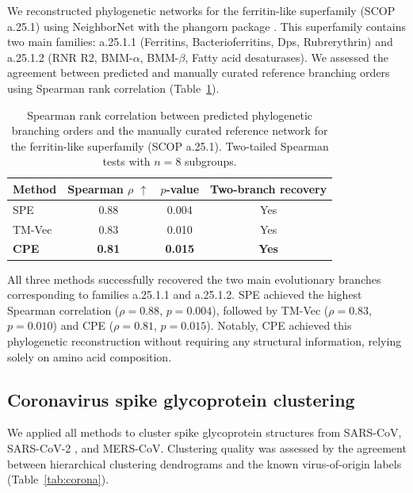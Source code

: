 \documentclass[11pt]{article}
\begin{document}
We reconstructed phylogenetic networks for the ferritin-like superfamily (SCOP a.25.1) using NeighborNet \citep{bryant2004} with the phangorn package \citep{schliep2011}. This superfamily contains two main families: a.25.1.1 (Ferritins, Bacterioferritins, Dps, Rubrerythrin) and a.25.1.2 (RNR R2, BMM-$\alpha$, BMM-$\beta$, Fatty acid desaturases). We assessed the agreement between predicted and manually curated reference branching orders using Spearman rank correlation (Table~\ref{tab:phylo}).

\begin{table}[H]
\centering
\caption{Spearman rank correlation between predicted phylogenetic branching orders and the manually curated reference network for the ferritin-like superfamily (SCOP a.25.1). Two-tailed Spearman tests with $n=8$ subgroups.}
\label{tab:phylo}
\begin{tabular}{lccc}
\toprule
\textbf{Method} & \textbf{Spearman $\rho$} $\uparrow$ & \textbf{$p$-value} & \textbf{Two-branch recovery} \\
\midrule
SPE & 0.88 & 0.004 & Yes \\
TM-Vec & 0.83 & 0.010 & Yes \\
\textbf{CPE} & \textbf{0.81} & \textbf{0.015} & \textbf{Yes} \\
\bottomrule
\end{tabular}
\end{table}

All three methods successfully recovered the two main evolutionary branches corresponding to families a.25.1.1 and a.25.1.2. SPE achieved the highest Spearman correlation ($\rho = 0.88$, $p = 0.004$), followed by TM-Vec ($\rho = 0.83$, $p = 0.010$) and CPE ($\rho = 0.81$, $p = 0.015$). Notably, CPE achieved this phylogenetic reconstruction without requiring any structural information, relying solely on amino acid composition.

\subsection{Coronavirus spike glycoprotein clustering}

We applied all methods to cluster spike glycoprotein structures from SARS-CoV, SARS-CoV-2 \citep{wrapp2020, wang2020}, and MERS-CoV. Clustering quality was assessed by the agreement between hierarchical clustering dendrograms and the known virus-of-origin labels (Table~\ref{tab:corona}).
\end{document}
